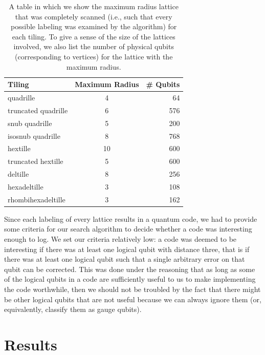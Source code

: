 \documentclass[12pt]{amsbook}
\theoremstyle{plain}
\theoremstyle{definition}
\theoremstyle{remark}
\begin{document}
\begin{table}
\begin{tabular}{lcr} \toprule
Tiling & Maximum Radius & \# Qubits\\ \midrule
quadrille & 4 & 64\\
truncated quadrille & 6 & 576\\
snub quadrille & 5 & 200\\
isosnub quadrille & 8 & 768\\
hextille & 10 & 600\\
truncated hextille & 5 & 600\\
deltille & 8 & 256\\
hexadeltille & 3 & 108\\
rhombihexadeltille & 3 & 162\\
\bottomrule
\end{tabular}
\caption[Lattice sizes scanned for each tiling]{
\label{table:maximum-radius-scanned}
A table in which we show the maximum radius lattice that was completely scanned (i.e., such that every possible labeling was examined by the algorithm) for each tiling.  To give a sense of the size of the lattices involved, we also list the number of physical qubits (corresponding to vertices) for the lattice with the maximum radius.
}
\end{table}

Since each labeling of every lattice results in a quantum code, we had to provide some criteria for our search algorithm to decide whether a code was interesting enough to log.  We set our criteria relatively low:  a code was deemed to be interesting if there was at least one logical qubit with distance three, that is if there was at least one logical qubit such that a single arbitrary error on that qubit can be corrected.  This was done under the reasoning that as long as some of the logical qubits in a code are sufficiently useful to us to make implementing the code worthwhile, then we should not be troubled by the fact that there might be other logical qubits that are not useful because we can always ignore them (or, equivalently, classify them as gauge qubits).
\section{Results} \label{sec:results}
\end{document}
